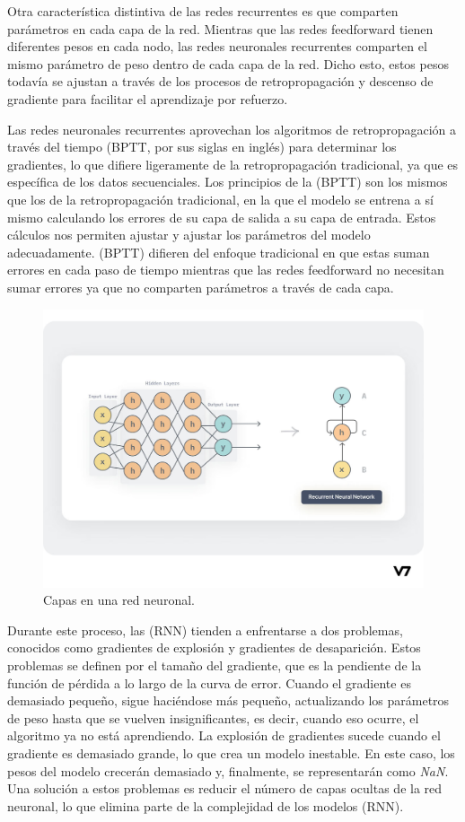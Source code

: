 \documentclass{article}
\begin{document}
Otra característica distintiva de las redes recurrentes es que comparten parámetros en cada capa de la red.
Mientras que las redes feedforward tienen diferentes pesos en cada nodo, las redes neuronales recurrentes comparten el mismo parámetro de peso dentro de cada capa de la red.
Dicho esto, estos pesos todavía se ajustan a través de los procesos de retropropagación y descenso de gradiente para facilitar el aprendizaje por refuerzo.

\newpage

Las redes neuronales recurrentes aprovechan los algoritmos de retropropagación a través del tiempo (BPTT, por sus siglas en inglés) para determinar los gradientes, lo que difiere ligeramente de la retropropagación tradicional, ya que es específica de los datos secuenciales.
Los principios de la (BPTT) son los mismos que los de la retropropagación tradicional, en la que el modelo se entrena a sí mismo calculando los errores de su capa de salida a su capa de entrada.
Estos cálculos nos permiten ajustar y ajustar los parámetros del modelo adecuadamente.
(BPTT) difieren del enfoque tradicional en que estas suman errores en cada paso de tiempo mientras que las redes feedforward no necesitan sumar errores ya que no comparten parámetros a través de cada capa.

\begin{figure}[H]
    \centering
    \includegraphics[scale=0.25]{capas.png}
    \caption{Capas en una red neuronal.}
\end{figure}

Durante este proceso, las (RNN) tienden a enfrentarse a dos problemas, conocidos como gradientes de explosión y gradientes de desaparición.
Estos problemas se definen por el tamaño del gradiente, que es la pendiente de la función de pérdida a lo largo de la curva de error.
Cuando el gradiente es demasiado pequeño, sigue haciéndose más pequeño, actualizando los parámetros de peso hasta que se vuelven insignificantes, es decir, cuando eso ocurre, el algoritmo ya no está aprendiendo.
La explosión de gradientes sucede cuando el gradiente es demasiado grande, lo que crea un modelo inestable.
En este caso, los pesos del modelo crecerán demasiado y, finalmente, se representarán como \textit{NaN}.
Una solución a estos problemas es reducir el número de capas ocultas de la red neuronal, lo que elimina parte de la complejidad de los modelos (RNN).
\end{document}
